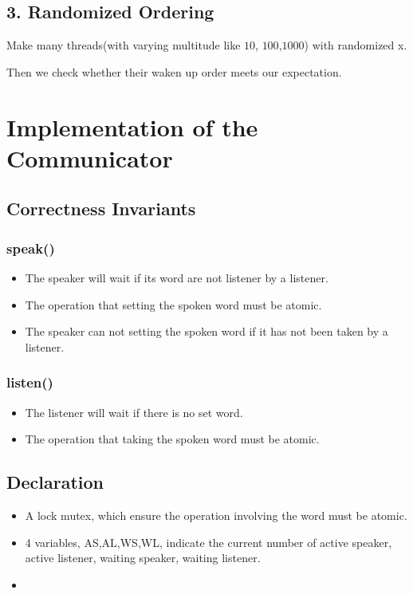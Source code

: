 \documentclass{article}
\begin{document}
	\subsection*{3. Randomized Ordering}
	Make many threads(with varying multitude like $10$, $100$,$1000$) with randomized x.
	
	Then we check whether their waken up order meets our expectation.
%	
	\section{Implementation of the Communicator}
	
	\subsection{Correctness Invariants}
	
	\subsubsection*{speak()}
	\begin{itemize}
		\item The speaker will wait if its word are not listener by a listener.
		\item The operation that setting the spoken word must be atomic.
		\item The speaker can not setting the spoken word if it has not been taken by a listener.
	\end{itemize}
	
	\subsubsection*{listen()}
	\begin{itemize}
		\item The listener will wait if there is no set word.
		\item The operation that taking the spoken word must be atomic.
	\end{itemize}
	
	\subsection{Declaration}
	\begin{itemize}
		\item A lock mutex, which ensure the operation involving the word must be atomic.
		
		\item 4 variables, AS,AL,WS,WL, indicate the current number of active speaker, active listener, waiting speaker, waiting listener.
		
		\item 
	\end{itemize}
	
\end{document}
